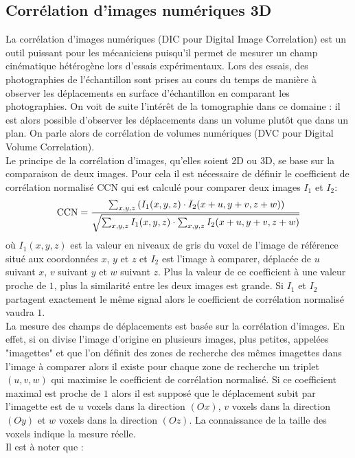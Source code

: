 	\subsection{Corrélation d'images numériques 3D}\label{para03:DIC}
		La corrélation d'images numériques (DIC pour Digital Image Correlation) est un outil puissant pour les mécaniciens puisqu'il permet de mesurer un champ cinématique hétérogène lors d'essais expérimentaux. Lors des essais, des photographies de l'échantillon sont prises au cours du temps de manière à observer les déplacements en surface d'échantillon en comparant les photographies. On voit de suite l'intérêt de la tomographie dans ce domaine : il est alors possible d'observer les déplacements dans un volume plutôt que dans un plan. On parle alors de corrélation de volumes numériques (DVC pour Digital Volume Correlation).
		\\Le principe de la corrélation d'images, qu'elles soient 2D ou 3D, se base sur la comparaison de deux images. Pour cela il est nécessaire de définir le coefficient de corrélation normalisé CCN qui est calculé pour comparer deux images $I_1$ et $I_2$:
		\begin{equation}\label{eq03:NCC}
			\mathrm{CCN} = \cfrac{\sum_{x,y,z} \left(I_1(x,y,z)\cdot I_2(x+u, y+v, z+w)\right)}{\sqrt{\sum_{x,y,z} I_1(x,y,z)\cdot \sum_{x,y,z} I_2(x+u, y+v, z+w)}}
		\end{equation}
		où $I_1(x,y,z)$ est la valeur en niveaux de gris du voxel de l'image de référence situé aux coordonnées $x$, $y$ et $z$ et $I_2$ est l'image à comparer, déplacée de $u$ suivant $x$, $v$ suivant $y$ et $w$ suivant $z$. Plus la valeur de ce coefficient à une valeur proche de $1$, plus la similarité entre les deux images est grande. Si $I_1$ et $I_2$ partagent exactement le même signal alors le coefficient de corrélation normalisé vaudra $1$.
		\\La mesure des champs de déplacements est basée sur la corrélation d'images. En effet, si on divise l'image d'origine en plusieurs images, plus petites, appelées "imagettes" et que l'on définit des zones de recherche des mêmes imagettes dans l'image à comparer alors il existe pour chaque zone de recherche un triplet $(u,v,w)$ qui maximise le coefficient de corrélation normalisé. Si ce coefficient maximal est proche de $1$ alors il est supposé que le déplacement subit par l'imagette est de $u$ voxels dans la direction $(Ox)$, $v$ voxels dans la direction $(Oy)$ et $w$ voxels dans la direction $(Oz)$. La connaissance de la taille des voxels indique la mesure réelle.
		\\Il est à noter que :
